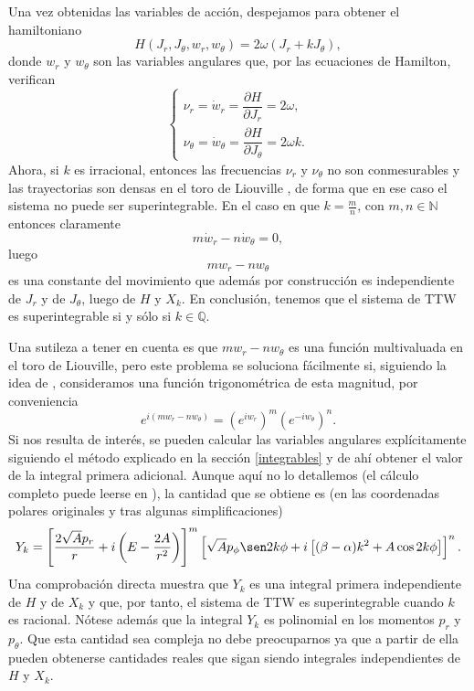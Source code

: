 \documentclass[11pt,a4paper,twoside]{article}
\theoremstyle{definition} \newtheorem{defn}[thm]{Definición}
\theoremstyle{definition} \newtheorem{ejemplo}[thm]{Ejemplo}
\theoremstyle{definition} \newtheorem{ejercicio}[thm]{Ejercicio}
\theoremstyle{remark} \newtheorem*{obs}{Observación}
\def\QQ{\mathbb{Q}}
\def\NN{\mathbb{N}}
\begin{document}
Una vez obtenidas las variables de acción, despejamos para obtener el hamiltoniano
\begin{equation}
  H(J_r,J_\theta,w_r,w_\theta)=2\omega(J_r+kJ_\theta),
\end{equation}
donde $w_r$ y $w_\theta$ son las variables angulares que, por las ecuaciones de Hamilton, verifican
\begin{equation}
  \begin{cases}
    \nu_r=\dot{w}_r=\dfrac{\partial H}{\partial J_r}=2\omega, \\[6 pt]
    \nu_{\theta}=\dot{w}_{\theta}=\dfrac{\partial H}{\partial J_\theta}=2\omega k.
  \end{cases}
\end{equation}
Ahora, si $k$ es irracional, entonces las frecuencias $\nu_r$ y $\nu_\theta$ no son conmesurables y las trayectorias son densas en el toro de Liouville \cite{arnold}, de forma que en ese caso el sistema no puede ser superintegrable. En el caso en que $k=\frac{m}{n}$, con $m,n \in \NN$ entonces claramente
\begin{equation*}
  m\dot{w}_r-n\dot{w}_\theta=0,
\end{equation*}
luego 
\begin{equation}
  mw_r-nw_\theta
\end{equation}
es una constante del movimiento que además por construcción es independiente de $J_r$ y de $J_\theta$, luego de $H$ y $X_k$. En conclusión, tenemos que el sistema de TTW es superintegrable si y sólo si $k\in \QQ$.

Una sutileza a tener en cuenta es que $mw_r-nw_\theta$ es una función multivaluada en el toro de Liouville, pero este problema se soluciona fácilmente si, siguiendo la idea de \cite{landau}, consideramos una función trigonométrica de esta magnitud, por conveniencia
\begin{equation}
  e^{i(mw_r-nw_{\theta})}=(e^{iw_r})^{m}(e^{-iw_{\theta}})^n.
\end{equation}
Si nos resulta de interés, se pueden calcular las variables angulares explícitamente siguiendo el método explicado en la sección \ref{integrables} y de ahí obtener el valor de la integral primera adicional. Aunque aquí no lo detallemos (el cálculo completo puede leerse en \cite{gonera}), la cantidad que se obtiene es (en las coordenadas polares originales y tras algunas simplificaciones)
\begin{equation}
  Y_{k}=\left[ \frac{2\sqrt{A}p_r}{r}+i\left( E-\frac{2A}{r^2} \right) \right]^m\left[\sqrt{A}p_{\phi}\sen 2k\phi + i\left[ (\beta-\alpha)k^2+A\cos2k\phi \right] \right]^n.
\end{equation}
Una comprobación directa muestra que $Y_{k}$ es una integral primera independiente de $H$ y de $X_k$ y que, por tanto, el sistema de TTW es superintegrable cuando $k$ es racional. Nótese además que la integral $Y_k$ es polinomial en los momentos $p_r$ y $p_\theta$. 
Que esta cantidad sea compleja no debe preocuparnos ya que a partir de ella pueden obtenerse cantidades reales que sigan siendo integrales independientes de $H$ y $X_k$.
\end{document}
